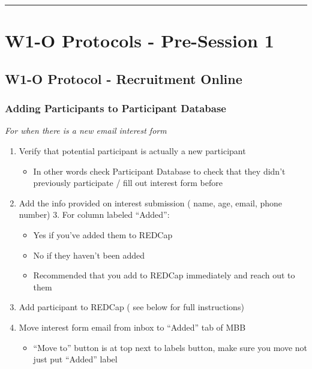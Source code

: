 \documentclass[
]{book}
\providecommand{\tightlist}{%
  \setlength{\itemsep}{0pt}\setlength{\parskip}{0pt}}
\begin{document}
\begin{center}\rule{0.5\linewidth}{0.5pt}\end{center}

\hypertarget{w1-o-protocols---pre-session-1}{%
\section{W1-O Protocols - Pre-Session 1}\label{w1-o-protocols---pre-session-1}}

\hypertarget{w1-o-protocol---recruitment-online}{%
\subsection{W1-O Protocol - Recruitment Online}\label{w1-o-protocol---recruitment-online}}

\hypertarget{adding-participants-to-participant-database}{%
\subsubsection{Adding Participants to Participant Database}\label{adding-participants-to-participant-database}}

\emph{For when there is a new email interest form }

\begin{enumerate}
\def\labelenumi{\arabic{enumi}.}
\tightlist
\item
  Verify that potential participant is actually a new participant

  \begin{itemize}
  \tightlist
  \item
    In other words check Participant Database to check that they didn't previously participate / fill out interest form before
  \end{itemize}
\item
  Add the info provided on interest submission ( name, age, email, phone number) 3. For column labeled ``Added'':

  \begin{itemize}
  \tightlist
  \item
    Yes if you've added them to REDCap
  \item
    No if they haven't been added
  \item
    Recommended that you add to REDCap immediately and reach out to them
  \end{itemize}
\item
  Add participant to REDCap ( see below for full instructions)
\item
  Move interest form email from inbox to ``Added'' tab of MBB

  \begin{itemize}
  \tightlist
  \item
    ``Move to'' button is at top next to labels button, make sure you move not just put ``Added'' label
  \end{itemize}
\end{enumerate}
\end{document}
